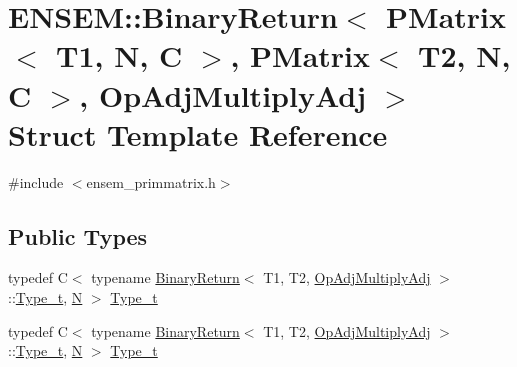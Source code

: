 \hypertarget{structENSEM_1_1BinaryReturn_3_01PMatrix_3_01T1_00_01N_00_01C_01_4_00_01PMatrix_3_01T2_00_01N_00_79410733ba13e6def1042c111bee3e0e}{}\section{E\+N\+S\+EM\+:\+:Binary\+Return$<$ P\+Matrix$<$ T1, N, C $>$, P\+Matrix$<$ T2, N, C $>$, Op\+Adj\+Multiply\+Adj $>$ Struct Template Reference}
\label{structENSEM_1_1BinaryReturn_3_01PMatrix_3_01T1_00_01N_00_01C_01_4_00_01PMatrix_3_01T2_00_01N_00_79410733ba13e6def1042c111bee3e0e}


{\ttfamily \#include $<$ensem\+\_\+primmatrix.\+h$>$}

\subsection*{Public Types}
\begin{DoxyCompactItemize}
\item 
typedef C$<$ typename \mbox{\hyperlink{structENSEM_1_1BinaryReturn}{Binary\+Return}}$<$ T1, T2, \mbox{\hyperlink{structENSEM_1_1OpAdjMultiplyAdj}{Op\+Adj\+Multiply\+Adj}} $>$\+::\mbox{\hyperlink{structENSEM_1_1BinaryReturn_3_01PMatrix_3_01T1_00_01N_00_01C_01_4_00_01PMatrix_3_01T2_00_01N_00_79410733ba13e6def1042c111bee3e0e_acfdb135f6900c8449768275be06883c7}{Type\+\_\+t}}, \mbox{\hyperlink{operator__name__util_8cc_a7722c8ecbb62d99aee7ce68b1752f337}{N}} $>$ \mbox{\hyperlink{structENSEM_1_1BinaryReturn_3_01PMatrix_3_01T1_00_01N_00_01C_01_4_00_01PMatrix_3_01T2_00_01N_00_79410733ba13e6def1042c111bee3e0e_acfdb135f6900c8449768275be06883c7}{Type\+\_\+t}}
\item 
typedef C$<$ typename \mbox{\hyperlink{structENSEM_1_1BinaryReturn}{Binary\+Return}}$<$ T1, T2, \mbox{\hyperlink{structENSEM_1_1OpAdjMultiplyAdj}{Op\+Adj\+Multiply\+Adj}} $>$\+::\mbox{\hyperlink{structENSEM_1_1BinaryReturn_3_01PMatrix_3_01T1_00_01N_00_01C_01_4_00_01PMatrix_3_01T2_00_01N_00_79410733ba13e6def1042c111bee3e0e_acfdb135f6900c8449768275be06883c7}{Type\+\_\+t}}, \mbox{\hyperlink{operator__name__util_8cc_a7722c8ecbb62d99aee7ce68b1752f337}{N}} $>$ \mbox{\hyperlink{structENSEM_1_1BinaryReturn_3_01PMatrix_3_01T1_00_01N_00_01C_01_4_00_01PMatrix_3_01T2_00_01N_00_79410733ba13e6def1042c111bee3e0e_acfdb135f6900c8449768275be06883c7}{Type\+\_\+t}}
\end{DoxyCompactItemize}


